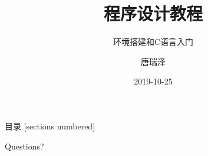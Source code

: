 \documentclass[10pt]{beamer}
\title{程序设计教程}
\subtitle{环境搭建和C语言入门}
\date{2019-10-25}
\author{唐瑞泽}
\institute{tangruize@smail.nju.edu.cn}
\begin{document}
	
\maketitle

\begin{frame}{目录}
	[sections numbered]
	\tableofcontents[hideallsubsections]
\end{frame}





\begin{frame}[standout]
	Questions?
\end{frame}
\end{document}

